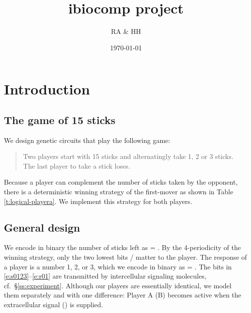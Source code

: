 \documentclass[12pt,notitlepage]{article}
\title{ibiocomp project}
\author{RA \& HH}
\date{\today}
\def\[#1\]{\begin{align}#1\end{align}}
\newcommand{\ra}[1]{{\color{Blue}#1}}
\begin{document}
\maketitle


\section{Introduction}

\subsection{The game of 15 sticks}

We design genetic circuits
that play the following game:
%
\begin{quote}
	Two players start with 15 sticks
	and alternatingly 
	take 1, 2 or 3 sticks.
	\\
	The last player to take a stick loses.
\end{quote}

Because a player can complement
the number of sticks taken by the opponent,
there is a deterministic winning strategy
of the first-mover
as shown in Table \ref{t:logical-playera}.
%
%
We implement this strategy for both players.


\subsection{General design} \label{s:general}

We encode in binary 
the number of sticks left as
\[
    \label{e:s0123}
     = 
    .
\]
%
%
By the 4-periodicity of the winning strategy,
only the two lowest bits /
matter to the player.
%
%
The response of a player is a number 1, 2, or 3,
which we encode in binary as
\[
    \label{e:r01}
     = 
    .
\]
%
The bits in \eqref{e:s0123}--\eqref{e:r01}
are transmitted by 
intercellular signaling molecules,
cf.~\S\ref{ss:experiment}.
%
Although our players are essentially identical,
we model them separately and with one difference:
Player A (B) becomes active when 
the extracellular signal  () is supplied.

%
\end{document}
